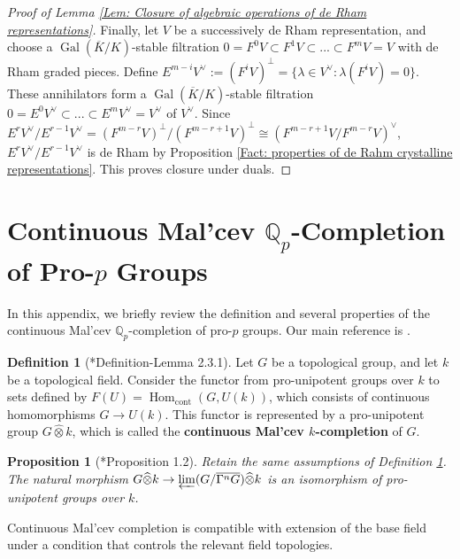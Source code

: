 \documentclass[11pt]{amsart}
\newtheorem{proposition}[theorem]{Proposition}
\theoremstyle{definition}
\newtheorem{definition}[theorem]{Definition}
\numberwithin{equation}{section}
\numberwithin{equation}{section}
\newcommand\QQ{\mathbb{Q}}
\DeclareMathOperator{\homo}{Hom}
\DeclareMathOperator{\Gal}{Gal}
\DeclareMathOperator{\cont}{cont}
\begin{document}
\begin{proof}[Proof of Lemma \ref{Lem: Closure of algebraic operations of de Rham representations}]
Finally, let $V$ be a successively de Rham representation, and choose a $\Gal(\overline{K}/K)$-stable filtration $0=F^0V\subset F^1V\subset ...\subset F^mV=V$ with de Rham graded pieces. Define $E^{m-i}V^{\vee}:=(F^iV)^{\perp}=\{\lambda\in V^{\vee}:\lambda(F^iV)=0\}$. These annihilators form a $\Gal(\overline{K}/K)$-stable filtration $0=E^0V^{\vee}\subset ...\subset E^mV^{\vee}=V^{\vee}$ of $V^{\vee}$. Since $E^{r}V^{\vee}/E^{r-1}V^{\vee}=(F^{m-r}V)^{\perp}/(F^{m-r+1}V)^{\perp}\cong (F^{m-r+1}V/F^{m-r}V)^{\vee}$, $E^{r}V^{\vee}/E^{r-1}V^{\vee}$ is de Rham by Proposition \ref{Fact: properties of de Rahm crystalline representations}. This proves closure under duals. 
\end{proof}

\section{Continuous Mal'cev $\QQ_p$-Completion of Pro-$p$ Groups}

In this appendix, we briefly review the definition and several properties of the continuous Mal'cev $\QQ_p$-completion of pro-$p$ groups. Our main reference is \cite{Hu-Wang-continuou-Malcev-completion}.

\begin{definition}[\cite{Betts-thesis}*{Definition-Lemma 2.3.1}]\label{Fact: definition of continuous Malcev completion}
Let $G$ be a topological group, and let $k$ be a topological field. Consider the functor from pro-unipotent groups over $k$ to sets defined by $F(U)=\homo_{\cont}(G,U(k))$, which consists of continuous homomorphisms $G\rightarrow U(k)$. This functor is represented by a pro-unipotent group $G\widehat{\otimes} k$, which is called the \textbf{continuous Mal'cev $k$-completion} of $G$.
\end{definition}

\begin{proposition}[\cite{Hu-Wang-continuou-Malcev-completion}*{Proposition 1.2}]\label{Prop: Malcev completion is the inverse limit of Malcev completion of lower central series}
Retain the same assumptions of Definition \ref{Fact: definition of continuous Malcev completion}.
The natural morphism
$G\widehat{\otimes} k\rightarrow \varprojlim (G/\overline{\Gamma^n G})\widehat{\otimes} k$ is an isomorphism of pro-unipotent groups over $k$.
\end{proposition}

Continuous Mal'cev completion is compatible with extension of the base field under a condition that controls the relevant field topologies.
\end{document}

